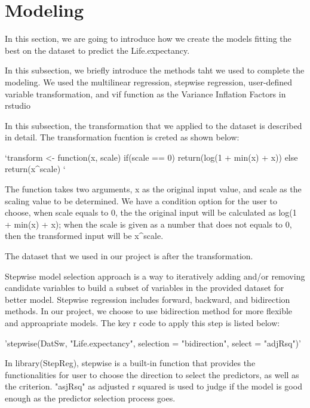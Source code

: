 \section{Modeling}
\label{sec:modeling}

In this section, we are going to introduce how we create the models fitting the best on the dataset to predict the Life.expectancy. 


In this subsection, we briefly introduce the methods taht we used to complete the modeling. We used the multilinear regression, stepwise regression, user-defined variable transformation, and vif function as the Variance Inflation Factors in rstudio


In this subsection, the transformation that we applied to the dataset is described in detail. The transformation fucntion is creted as shown below:

`transform <- function(x, scale) {
  if(scale == 0) return(log(1 + min(x) + x))
  else return(x^scale)
}`

The function takes two arguments, x as the original input value, and scale as the scaling value to be determined. We have a condition option for the user to choose, when scale equals to 0, the the original input will be calculated as log(1 + min(x) + x); when the scale is given as a number that does not equals to 0, then the transformed input will be x^scale.

The dataset that we used in our project is after the transformation.


Stepwise model selection approach is a way to iteratively adding and/or removing candidate variables to build a subset of variables in the provided dataset for better model. Stepwise regression includes forward, backward, and bidirection methods. In our project, we choose to use bidirection method for more flexible and approapriate models. The key r code to apply this step is listed below:

'stepwise(DatSw, "Life.expectancy", selection = "bidirection", select = "adjRsq")'

In library(StepReg), stepwise is a built-in function that provides the functionalities for user to choose the direction to select the predictors, as well as the criterion. "asjRsq" as adjusted r squared is used to judge if the model is good enough as the predictor selection process goes.

